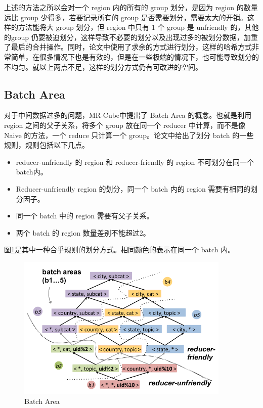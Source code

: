 上述的方法之所以会对一个 region 内的所有的 group 划分，是因为 region 的数量远比 group 少得多，若要记录所有的 group 是否需要划分，需要太大的开销。这样的方法能将大 group 划分，但 region 中只有 1 个 group 是 unfriendly 的，其他的group 仍要被迫划分，这样导致不必要的划分以及出现过多的被划分数据，加重了最后的合并操作。同时，论文中使用了求余的方式进行划分，这样的哈希方式非常简单，在很多情况下也是有效的，但是在一些极端的情况下，也可能导致划分的不均匀。就以上两点不足，这样的划分方式仍有可改进的空间。

\subsection{Batch Area}

对于中间数据过多的问题，MR-Cube中提出了 Batch Area 的概念。也就是利用 region 之间的父子关系，将多个 group 放在同一个 reducer 中计算，而不是像 Naive 的方法，一个 reduce 只计算一个 group。论文中给出了划分 batch 的一些规则，规则包括以下几点。
\begin{itemize}
\item reducer-unfriendly 的 region 和 reducer-friendly 的 region 不可划分在同一个batch内。
\item Reducer-unfriendly region 的划分，同一个 batch 内的 region 需要有相同的划分因子。
\item 同一个 batch 中的 region 需要有父子关系。
\item 两个 batch 的 region 数量差别不能超过2。
\end{itemize}

图\ref{batch_area}是其中一种合乎规则的划分方式。相同颜色的表示在同一个 batch 内。　

\begin{figure}[!htbp] 
\centering\includegraphics[width=4in]{picture/ch_datacube_mr/batch_area} 
\caption{Batch Area}\label{batch_area} 
\end{figure}


